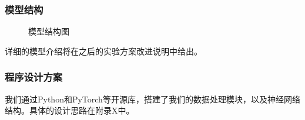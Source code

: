 \subsubsection{模型结构}
\begin{figure}[htb]        
\caption{\label{4} 模型结构图}      
\end{figure}

详细的模型介绍将在之后的实验方案改进说明中给出。

\subsubsection{程序设计方案}
我们通过Python和PyTorch等开源库，搭建了我们的数据处理模块，以及神经网络结构。具体的设计思路在附录X中。